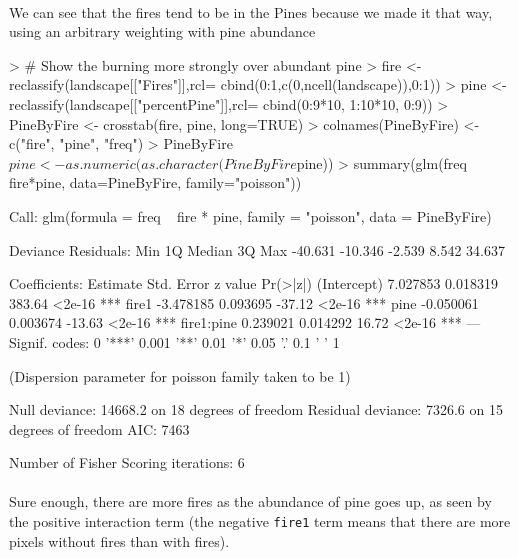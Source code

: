 \documentclass{article}
\begin{document}
\paragraph{}
We can see that the fires tend to be in the Pines because we made it that way, using an arbitrary weighting with pine abundance

\begin{Schunk}
\begin{Sinput}
> # Show the burning more strongly over abundant pine
> fire <- reclassify(landscape[["Fires"]],rcl= cbind(0:1,c(0,ncell(landscape)),0:1))
> pine <- reclassify(landscape[["percentPine"]],rcl= cbind(0:9*10, 1:10*10, 0:9))
> PineByFire <- crosstab(fire, pine, long=TRUE)
> colnames(PineByFire) <- c("fire", "pine", "freq")
> PineByFire$pine <- as.numeric(as.character(PineByFire$pine))
> summary(glm(freq ~ fire*pine, data=PineByFire, family="poisson"))
\end{Sinput}
\begin{Soutput}
Call:
glm(formula = freq ~ fire * pine, family = "poisson", data = PineByFire)

Deviance Residuals: 
    Min       1Q   Median       3Q      Max  
-40.631  -10.346   -2.539    8.542   34.637  

Coefficients:
             Estimate Std. Error z value Pr(>|z|)    
(Intercept)  7.027853   0.018319  383.64   <2e-16 ***
fire1       -3.478185   0.093695  -37.12   <2e-16 ***
pine        -0.050061   0.003674  -13.63   <2e-16 ***
fire1:pine   0.239021   0.014292   16.72   <2e-16 ***
---
Signif. codes:  0 '***' 0.001 '**' 0.01 '*' 0.05 '.' 0.1 ' ' 1

(Dispersion parameter for poisson family taken to be 1)

    Null deviance: 14668.2  on 18  degrees of freedom
Residual deviance:  7326.6  on 15  degrees of freedom
AIC: 7463

Number of Fisher Scoring iterations: 6
\end{Soutput}
\end{Schunk}

\paragraph{}
Sure enough, there are more fires as the abundance of pine goes up, as seen by the positive interaction term (the negative \texttt{fire1} term means that there are more pixels without fires than with fires).
\end{document}
